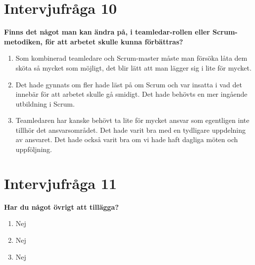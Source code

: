 \section{Intervjufråga 10}
\textbf{Finns det något man kan ändra på, i teamledar-rollen eller Scrum-metodiken, för att arbetet skulle kunna förbättras?}
\begin{enumerate}
\item Som kombinerad teamledare och Scrum-master måste man försöka låta dem sköta så mycket som möjligt, det blir lätt att man lägger sig i lite för mycket.
\item Det hade gynnats om fler hade läst på om Scrum och var insatta i vad det innebär för att arbetet skulle gå smidigt. Det hade behövts en mer ingående utbildning i Scrum.
\item Teamledaren har kanske behövt ta lite för mycket ansvar som egentligen inte tillhör det ansvarsområdet. Det hade varit bra med en tydligare uppdelning av ansvaret. Det hade också varit bra om vi hade haft dagliga möten och uppföljning.
\end{enumerate}

\section{Intervjufråga 11}
\textbf{Har du något övrigt att tillägga?}
\begin{enumerate}
\item Nej
\item Nej
\item Nej
\end{enumerate}